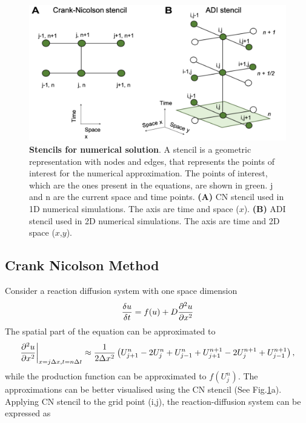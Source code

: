 \begin{figure}[H]

    \includegraphics[width=1\textwidth]{chapters/Methods/stencils}
    \caption{\textbf{Stencils for numerical solution}.  A stencil is a geometric representation with nodes and edges, that represents the points of interest for the numerical approximation. The points of interest, which are the ones present in the equations, are shown in green. j and n are the current space and time points. \textbf{(A)} \acrlong{CN} stencil used in 1D numerical simulations. The axis are time and space ($x$). \textbf{(B)} \acrshort{ADI} stencil used in 2D numerical simulations. The axis are time and 2D space ($x$,$y$).}
    \label{fig:stencils}
\end{figure}


\subsection{Crank Nicolson Method}\label{cranknicolson}
Consider a reaction diffusion system with one space dimension
\begin{equation}
    \frac{\delta u}{\delta t} =  f(u) + D\frac{\partial^{2} {u}}{\partial {x}^{2}}
\end{equation}
The spatial part of the equation can be approximated to
\begin{equation}
    \frac{\partial^{2} {u}}{\partial {x}^{2}} \biggr\rvert_{x=j\Delta x,t=n\Delta t} \approx \frac{1}{2\Delta x^{2}}\left( U^{n}_{j+1} -  2U^{n}_{j} + U^{n}_{j-1} + U^{n+1}_{j+1} - 2U^{n+1}_{j} + U^{n+1}_{j-1}\right),
\end{equation}
while the production function can be approximated to $f ( U^{n}_{j})$.  The approximations can be better visualised using the \acrshort{CN} stencil (See Fig.\ref{fig:stencils}a).
Applying \acrshort{CN} stencil to the grid point (i,j), the reaction-diffusion system can be expressed as

